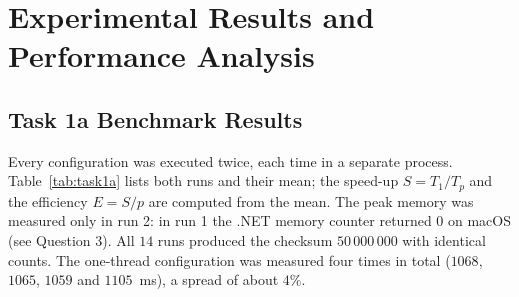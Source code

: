 \documentclass[11pt,a4paper]{article}
\begin{document}
\section{Experimental Results and Performance Analysis}

\subsection{Task 1a Benchmark Results}
Every configuration was executed twice, each time in a separate process. Table~\ref{tab:task1a} lists both runs and their mean; the speed-up $S = T_1/T_p$ and the efficiency $E = S/p$ are computed from the mean. The peak memory was measured only in run 2: in run 1 the .NET memory counter returned $0$ on macOS (see Question 3). All $14$ runs produced the checksum $50\,000\,000$ with identical counts. The one-thread configuration was measured four times in total ($1068$, $1065$, $1059$ and $1105$~ms), a spread of about $4\%$.

\begin{table}[H]
\centering
\caption{Task 1a: Execution Time, Speed-up, and Peak Memory vs. Thread Count}
\label{tab:task1a}
\vspace{2mm}
\small
\setlength{\tabcolsep}{5pt}
\end{table}
\end{document}
